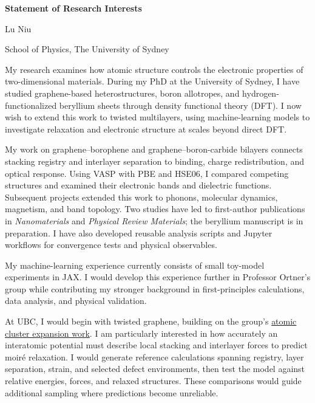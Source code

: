 \documentclass[12pt,a4paper]{article}
\begin{document}
\begin{center}
    {\Large\bfseries Statement of Research Interests}\par
    \vspace{0.2em}
    {\large Lu Niu}\par
    School of Physics, The University of Sydney
\end{center}
\vspace{-0.4em}

My research examines how atomic structure controls the electronic properties of two-dimensional materials.
During my PhD at the University of Sydney, I have studied graphene-based heterostructures, boron allotropes, and hydrogen-functionalized beryllium sheets through density functional theory (DFT).
I now wish to extend this work to twisted multilayers, using machine-learning models to investigate relaxation and electronic structure at scales beyond direct DFT.

My work on graphene--borophene and graphene--boron-carbide bilayers connects stacking registry and interlayer separation to binding, charge redistribution, and optical response.
Using VASP with PBE and HSE06, I compared competing structures and examined their electronic bands and dielectric functions.
Subsequent projects extended this work to phonons, molecular dynamics, magnetism, and band topology.
Two studies have led to first-author publications in \textit{Nanomaterials} and \textit{Physical Review Materials}; the beryllium manuscript is in preparation.
I have also developed reusable analysis scripts and Jupyter workflows for convergence tests and physical observables.

My machine-learning experience currently consists of small toy-model experiments in JAX.
I would develop this experience further in Professor Ortner's group while contributing my stronger background in first-principles calculations, data analysis, and physical validation.

At UBC, I would begin with twisted graphene, building on the group's \href{https://doi.org/10.1088/2632-2153/ae1807}{atomic cluster expansion work}.
I am particularly interested in how accurately an interatomic potential must describe local stacking and interlayer forces to predict moir\'e relaxation.
I would generate reference calculations spanning registry, layer separation, strain, and selected defect environments, then test the model against relative energies, forces, and relaxed structures.
These comparisons would guide additional sampling where predictions become unreliable.
\end{document}
